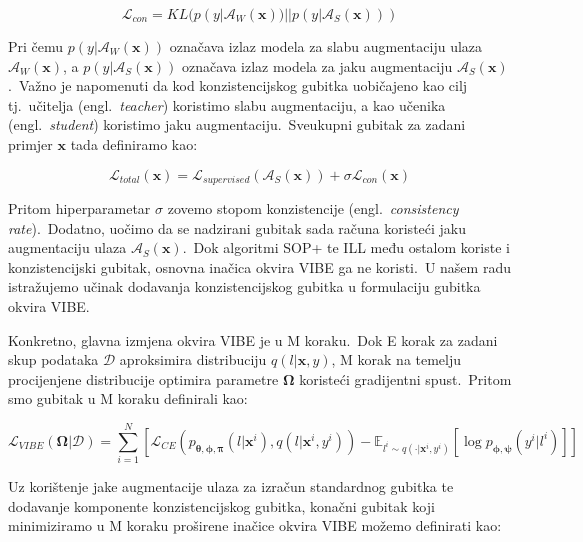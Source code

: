 \documentclass[diplomskirad]{fer}
\begin{document}
\begin{equation}
  \mathcal{L}_{con} = KL(p(y | \mathcal{A}_{W}(\bm{x})) || p(y | \mathcal{A}_{S}(\bm{x})))
  \label{eq:con_loss}
\end{equation}

Pri čemu $p(y | \mathcal{A}_{W}(\bm{x}))$ označava izlaz modela za slabu augmentaciju ulaza $\mathcal{A}_{W}(\bm{x})$, a $p(y | \mathcal{A}_{S}(\bm{x}))$ označava izlaz modela za jaku augmentaciju $\mathcal{A}_{S}(\bm{x})$.\ 
Važno je napomenuti da kod konzistencijskog gubitka uobičajeno kao cilj tj.\ učitelja (engl.\ \textit{teacher}) koristimo slabu augmentaciju, a kao učenika (engl.\ \textit{student}) koristimo jaku augmentaciju.\ 
Sveukupni gubitak za zadani primjer $\bm{x}$ tada definiramo kao:

\begin{equation}
  \mathcal{L}_{total}(\bm{x}) = \mathcal{L}_{supervised}(\mathcal{A}_{S}(\bm{x})) + \sigma \mathcal{L}_{con}(\bm{x})
  \label{eq:con_loss}
\end{equation}

Pritom hiperparametar $\sigma$ zovemo stopom konzistencije (engl.\ \textit{consistency rate}).\ Dodatno, uočimo da se nadzirani gubitak sada računa koristeći jaku augmentaciju ulaza $\mathcal{A}_{S}(\bm{x})$.\ 
Dok algoritmi SOP+ te ILL među ostalom koriste i konzistencijski gubitak, osnovna inačica okvira VIBE ga ne koristi.\ 
U našem radu istražujemo učinak dodavanja konzistencijskog gubitka u formulaciju gubitka okvira VIBE.\

Konkretno, glavna izmjena okvira VIBE je u M koraku.\ Dok E korak za zadani skup podataka $\mathcal{D}$ aproksimira distribuciju $q(l | \bm{x}, y)$, M korak na temelju procijenjene distribucije optimira parametre $\bm{\Omega}$ koristeći gradijentni spust.\ 
Pritom smo gubitak u M koraku definirali kao:

\begin{equation}
  \mathcal{L}_{VIBE}(\bm{\Omega} | \mathcal{D}) = \sum_{i=1}^{N} \left[ \mathcal{L}_{CE} (p_{\bm{\theta}, \bm{\phi}, \bm{\pi}}(l | \bm{x}^i), q(l | \bm{x}^i, y^i)) - \mathbb{E}_{l^i \sim q(\cdot | \bm{x}^i, y^i)} \left[ \log p_{\bm{\phi}, \bm{\psi}}(y^i | l^i) \right] \right]
  \label{eq:vibe_m_step_loss}
\end{equation}

\pagebreak

Uz korištenje jake augmentacije ulaza za izračun standardnog gubitka te dodavanje komponente konzistencijskog gubitka, konačni gubitak koji minimiziramo u M koraku proširene inačice okvira VIBE možemo definirati kao:
\end{document}
